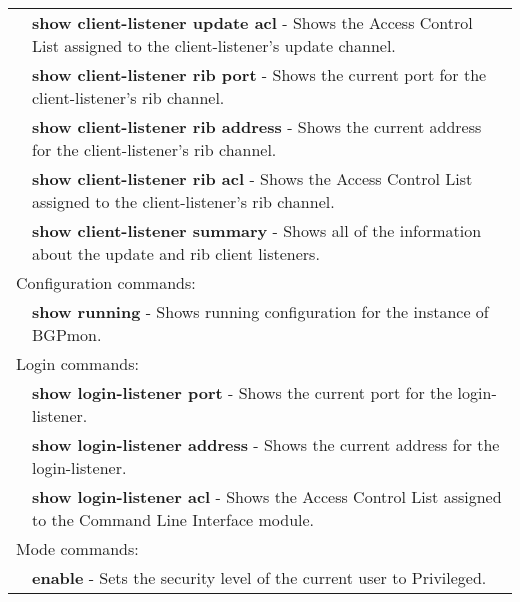 \begin{tabular}{|p{10pt}p{400pt}|}
& {\bf \small show client-listener update acl} - Shows the Access Control List assigned to the client-listener's update channel.\\[4pt]

& {\bf \small show client-listener rib port} - Shows the current port for the client-listener's rib channel.\\[4pt]

& {\bf \small show client-listener rib address} - Shows the current address for the client-listener's rib channel.\\[4pt]

& {\bf \small show client-listener rib acl} - Shows the Access Control List assigned to the client-listener's rib channel.\\[4pt]

& {\bf \small show client-listener summary} - Shows all of the information about the update and rib client listeners.\\[4pt]

\hline

\multicolumn{2}{|l|}{Configuration commands:}\\ 

\hline

& {\bf \small show running} - Shows running configuration for the instance of BGPmon.\\[4pt]

\hline

\multicolumn{2}{|l|}{Login commands:}\\ 

\hline

& {\bf \small show login-listener port} - Shows the current port for the login-listener.\\[4pt]

& {\bf \small show login-listener address} - Shows the current address for the login-listener.\\[4pt]

& {\bf \small show login-listener acl} - Shows the Access Control List assigned to the Command Line Interface module.\\[4pt]

\hline

\multicolumn{2}{|l|}{Mode commands:}\\ 

\hline

& {\bf \small enable} - Sets the security level of the current user to Privileged.\\[4pt]


\end{tabular}

